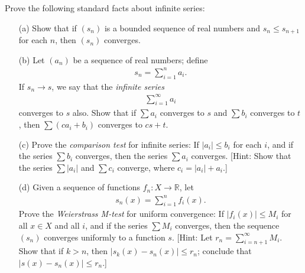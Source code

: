 \begin{exercise}[Munkres 21.11]
  Prove the following standard facts about infinite series:
  \begin{enumerate} 
    \item[(a)] Show that if $(s_n)$ is a bounded sequence of real numbers and $s_n \leq s_{n+1}$ for each $n$, then $(s_n)$ converges.
    \item[(b)] Let $(a_n)$ be a sequence of real numbers; define
    \begin{align*}
      s_n = \sum_{i=1}^{n} a_i.
    \end{align*}
    If $s_n \to s$, we say that the \textit{infinite series}
    \begin{align*}
      \sum_{i=1}^{\infty} a_i
    \end{align*}
    converges to $s$ also. Show that if $\sum a_i$ converges to $s$ and $\sum b_i$ converges to $t$, then $\sum(ca_i + b_i)$ converges to $cs + t$.
    \item[(c)] Prove the \textit{comparison test} for infinite series: If $|a_i| \leq b_i$ for each $i$, and if the series $\sum b_i$ converges, then the series $\sum a_i$ converges. [Hint: Show that the series $\sum|a_i|$ and $\sum c_i$ converge, where $c_i = |a_i| + a_i$.]
    \item[(d)] Given a sequence of functions $f_n : X \to \mathbb{R}$, let
    \begin{align*}
      s_n(x) = \sum_{i=1}^{n} f_i(x).
    \end{align*}
    Prove the \textit{Weierstrass M-test} for uniform convergence: If $|f_i(x)| \leq M_i$ for all $x \in X$ and all $i$, and if the series $\sum M_i$ converges, then the sequence $(s_n)$ converges uniformly to a function $s$. [Hint: Let $r_n = \sum_{i=n+1}^{\infty} M_i$. Show that if $k > n$, then $|s_k(x) - s_n(x)| \leq r_n$; conclude that $|s(x) - s_n(x)| \leq r_n$.]
  \end{enumerate}
\end{exercise}

